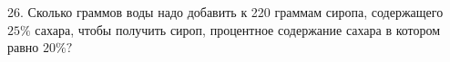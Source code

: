 26. Сколько граммов воды надо добавить к 220 граммам сиропа, содержащего $25\%$ сахара, чтобы получить сироп, процентное содержание сахара в котором равно $20\%?$\\
